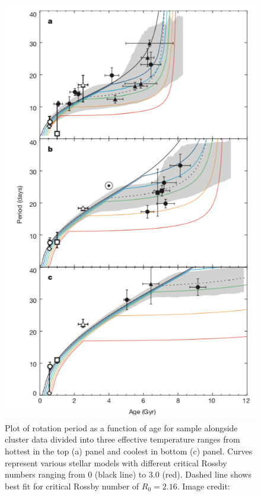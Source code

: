 \begin{figure}
    \centering
    \includegraphics[scale=0.35]{Figures/2-Historical_overview/van_saders_R0_plot.png}
    \caption[Rotation period as a function of age with various stellar models that include a critical Rossby number]{Plot of rotation period as a function of age  for \citet{van_Saders_etal_2016} sample alongside cluster data divided into three effective temperature ranges from hottest in the top (a) panel and coolest in bottom (c) panel. Curves represent various stellar models with different critical Rossby numbers ranging from 0 (black line) to 3.0 (red). Dashed line shows best fit for critical Rossby number of $R_{0} = 2.16$. Image credit: \citet{van_Saders_etal_2016}}
    \label{fig:van_saders_plot_2}
\end{figure}

